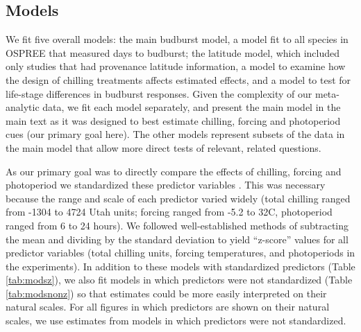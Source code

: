 \documentclass{article}
\begin{document}
\subsection*{Models}

\par We fit five overall models: the main budburst model, a model fit to all species in OSPREE that measured days to budburst; the latitude model, which included only studies that had provenance latitude information, a model to examine how the design of chilling treatments affects estimated effects, and a model to test for life-stage differences in budburst responses. %
Given the complexity of our meta-analytic data, we fit each model separately, and present the main model in the main text as it was designed to best estimate chilling, forcing and photoperiod cues (our primary goal here). The other models represent subsets of the data in the main model that allow more direct tests of relevant, related questions. 

\par As our primary goal was to directly compare the effects of chilling, forcing and photoperiod we standardized these predictor variables \emph{\citep{gelman2006}}. This was necessary because the range and scale of each predictor varied widely (total chilling ranged from -1304 to 4724 Utah units; forcing ranged from -5.2 to 32\degree C, photoperiod ranged from 6 to 24 hours). We followed well-established methods of subtracting the mean and dividing by the standard deviation \emph{\citep{gelman2006}} to yield ``z-score'' values for all predictor variables (total chilling units, forcing temperatures, and photoperiods in the experiments).  In addition to these models with standardized predictors (Table \ref{tab:modsz}), we also fit models in which predictors were not standardized (Table \ref{tab:modsnonz}) so that estimates could be more easily interpreted on their natural scales. For all figures in which predictors are shown on their natural scales, we use estimates from models in which predictors were not standardized. 
\end{document}
